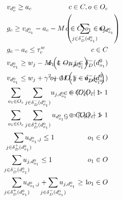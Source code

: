 \documentclass[authoryear,preprint,review,11pt]{elsarticle}
\begin{document}
{\begin{alignat}{3}
    \label{mod:c8}         & v_{d^0_{o}} \geq a_c    & \hspace{-50mm}  c \in C, o \in O_c \text{ }                           \\
    \label{mod:c9}          & g_{c} \geq v_{d^0_{o_1}} - a_c - M\left(  \sum_{ j \in \delta^{-}_{D}(d^0_{o_1})  }{u_{jd^0_{o_1}}}\right)  & \hspace{-50mm}   c \in C, o_1 \in O_c \text{ }  \\
    \label{mod:c91}  & g_{c} - a_c \leq \tau^w_c  & \hspace{-20mm}   c \in C \text{ }   \\
    \label{mod:c101}       & v_{d^0_{o_1}} \geq w_j - M\left(1- u_{jd^0_{o_1}}\right)   & \hspace{-50mm}    o_1 \in O_i,  j \in \delta_{D}^{-}(d^0_{o_1}) \text{ }                \\
    \label{mod:c10}        & v_{d^0_{o_1}}  \leq  w_j + \gamma^2 + M\left(1- u_{j,d^0_{o_1}}\right)     & \hspace{-40mm}   o_1 \in O,  j \in \delta_{D}^{-}(d^0_{o_1}) \text{ }                    \\
    \label{mod:c11}        & \sum_{ \substack{o_1 \in O_c }}{ \sum_{ j \in \delta^{-}_{D}(d^0_{o_1})}}{u_{j,d^0_{o_1} } } = |O_c|-1      & \hspace{-40mm}  c \in C,|O_c| > 1   \text{ }   \\
    \label{mod:c12}        & \sum_{ \substack{o_1 \in O_c }}\sum_{ j \in \delta^{+}_{D}(d^0_{o_1})}{u_{d^0_{o_1},j } } = |O_c|-1      & \hspace{-40mm}  c \in C, |O_c| > 1  \text{ }          \\
    \label{mod:c13}    & \hspace{3mm} \smashoperator{ \sum_{ j \in \delta^{+}_{D}(d^0_{o_1})}}{u_{d^0_{o_1},j } } \leq 1    & \hspace{-20mm}  o_1 \in O \text{ }         \\
    \label{mod:c14}        & \hspace{2mm} \smashoperator{ \sum_{ j \in \delta^{-}_{D}(d^0_{o_1})}}{u_{j,d^0_{o_1} } } \leq 1      & \hspace{-20mm} o_1 \in O \text{ }        \\
    \label{mod:c15}        & \hspace{2mm} \smashoperator{ \sum_{ j \in \delta^{+}_{D}(d^0_{o_1})}}{u_{d^0_{o_1},j } } +\smashoperator{ \sum_{ j \in \delta^{-}_{D}(d^0_{o_1})}}{u_{j,d^0_{o_1} } } \geq 1    & \hspace{-50mm} o_1 \in O \text{ }    \\

\end{alignat}}
\end{document}
